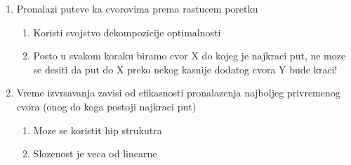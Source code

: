 \documentclass{article} %
\begin{document}
\begin{enumerate}
	\item Pronalazi puteve ka cvorovima prema rastucem poretku
	\begin{enumerate}
		\item Koristi svojstvo dekompozicije optimalnosti
		\item 	Posto u svakom koraku biramo cvor X do kojeg je najkraci put, ne moze se desiti da put do X preko nekog
				kasnije dodatog cvora Y bude kraci!
	\end{enumerate}
	\item Vreme izvrsavanja zavisi od efikasnosti pronalazenja najboljeg privremenog cvora (onog do koga postoji najkraci 					put)
		\begin{enumerate}
			\item Moze se koristit hip strukutra
			\item Slozenost je veca od linearne
		\end{enumerate}
\end{enumerate}
\end{document}
